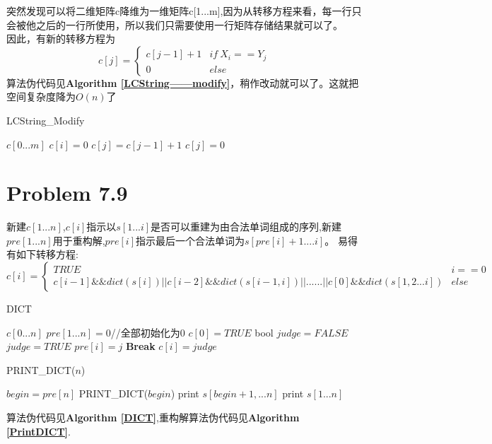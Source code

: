 \documentclass[onecolumn]{ctexart}
\begin{document}
\indent 突然发现可以将二维矩阵c降维为一维矩阵c[1...m],因为从转移方程来看，每一行只会被他之后的一行所使用，所以我们只需要使用一行矩阵存储结果就可以了。\\
\indent 因此，有新的转移方程为
\[
c[j]=
\begin{cases}
c[j-1]+1 &if\ X_i==Y_j\\
0 &else
\end{cases}
\] 
算法伪代码见\textbf{Algorithm \ref{LCString——modify}}，稍作改动就可以了。这就把空间复杂度降为$O(n)了$\\
\begin{algorithm}[htbp]
	\caption{LCString\_Modify}
	\label{LCString——modify}
	\begin{algorithmic}[1]
		\STATE $c[0...m]$
		\STATE $c[i]=0$
		\ENDFOR
		\STATE $c[j]=c[j-1]+1$
		\ELSE
		\STATE $c[j]=0$
		\ENDIF
		\ENDFOR
		\ENDFOR
	\end{algorithmic}
\end{algorithm}

\section*{Problem 7.9}
\indent 新建$c[1...n]$,$c[i]$指示以$s[1...i]$是否可以重建为由合法单词组成的序列,新建$pre[1...n]$用于重构解,$pre[i]$指示最后一个合法单词为$s[pre[i]+1....i]$。
\indent 易得有如下转移方程:
\[
c[i]=
\begin{cases}
TRUE & i==0\\
c[i-1]\&\&dict(s[i])||c[i-2]\&\&dict(s[i-1,i])||......||c[0]\&\&dict(s[1,2...i]) &else
\end{cases}
\] 
\begin{algorithm}[htbp]
	\caption{DICT}
	\label{DICT}
	\begin{algorithmic}[1]
		\STATE $c[0...n]$
		\STATE $pre[1...n]={0}$//全部初始化为0
		\STATE $c[0]=TRUE$
			\STATE bool $judge=FALSE$
					\STATE $judge=TRUE$
					\STATE $pre[i]=j$
				\STATE \textbf{Break}
				\ENDIF
				\STATE $c[i]=judge$
			\ENDFOR
		\ENDFOR
	\end{algorithmic}
\end{algorithm}

\begin{algorithm}[htbp]
	\caption{PRINT\_DICT($n$)}
	\label{PrintDICT}
	\begin{algorithmic}[1]
		\STATE $begin=pre[n]$
			\STATE PRINT\_DICT($begin$)
			\STATE print $s[begin+1,...n]$
		\ELSE
			\STATE print $s[1...n]$
		\ENDIF
	\end{algorithmic}
\end{algorithm}

\indent 算法伪代码见\textbf{Algorithm \ref{DICT}},重构解算法伪代码见\textbf{Algorithm \ref{PrintDICT}}.
\end{document}
